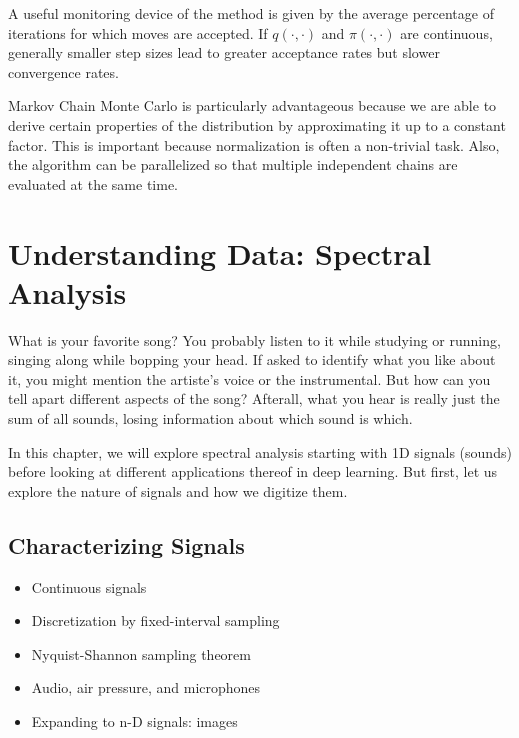 \documentclass[paper=a4, fontsize=12pt]{scrartcl} %
\numberwithin{equation}{section} %
\numberwithin{figure}{section} %
\numberwithin{table}{section} %
\begin{document}
A useful monitoring device of the method is given by the average percentage of iterations for which moves are accepted. 
If $q(\cdot, \cdot)$ and $\pi(\cdot, \cdot)$ are continuous, generally smaller step sizes lead to greater acceptance 
rates but slower convergence rates.

Markov Chain Monte Carlo is particularly advantageous because we are able to derive certain properties of the 
distribution by approximating it up to a constant factor. This is important because normalization is often a non-trivial task.
Also, the algorithm can be parallelized so that multiple independent chains are evaluated at the same time.

\pagebreak


\section{Understanding Data: Spectral Analysis}

What is your favorite song? You probably listen to it while studying or running, singing along
while bopping your head. If asked to identify what you like about it, you might mention the artiste's voice 
or the instrumental. But how can you tell apart different aspects of the song? Afterall, what you hear 
is really just the sum of all sounds, losing information about which sound is which.

In this chapter, we will explore spectral analysis starting with 1D signals (sounds) before looking at different 
applications thereof in deep learning. But first, let us explore the nature of signals and how we digitize them.

\subsection{Characterizing Signals}

\begin{itemize}
    \item Continuous signals
    \item Discretization by fixed-interval sampling
    \item Nyquist-Shannon sampling theorem
    \item Audio, air pressure, and microphones
    \item Expanding to n-D signals: images
\end{itemize}
\end{document}
